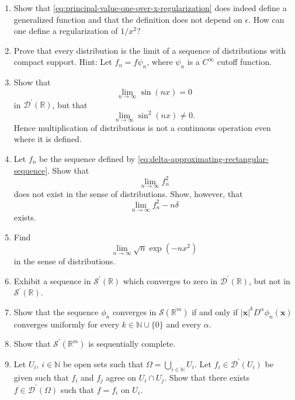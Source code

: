 \begin{enumerate}[label=\thesection.\arabic*.,ref=\thesection.\arabic*,start=1,series=book-problems]
\item\label{ex:principal-value-regularization} Show that \eqref{eq:principal-value-one-over-x-regularization} does indeed define a generalized function and that the definition does not depend on $\epsilon$. How can one define a regularization of $1/x^2$?

\item\label{ex:compactly-supported-distribution-density} Prove that every distribution is the limit of a sequence of distributions with compact support. Hint: Let $f_n=f\psi_n$, where $\psi_n$ is a $C^\infty$ cutoff function.

\item\label{ex:distribution-multiplication-not-continuous} Show that \[\lim_{n\to\infty}\sin(nx)=0\] in $\mathcal{D}^{\prime}(\mathbb{R})$, but that \[\lim_{n\to\infty}\sin^2(nx)\ne0.\] Hence multiplication of distributions is not a continuous operation even where it is defined.

\item\label{ex:delta-approximation-square-divergence} Let $f_n$ be the sequence defined by \eqref{eq:delta-approximating-rectangular-sequence}. Show that \[\lim_{n\to\infty}f_n^2\] does not exist in the sense of distributions. Show, however, that \[\lim_{n\to\infty}f_n^2-n\delta\] exists.

\item\label{ex:gaussian-distribution-limit} Find \[\lim_{n\to\infty}\sqrt n\exp(-nx^2)\] in the sense of distributions.

\item\label{ex:distribution-not-tempered-convergence} Exhibit a sequence in $\mathcal{S}^{\prime}(\mathbb{R})$ which converges to zero in $\mathcal{D}^{\prime}(\mathbb{R})$, but not in $\mathcal{S}^{\prime}(\mathbb{R})$.

\item\label{ex:rapid-tests-weighted-uniform-convergence} Show that the sequence $\phi_n$ converges in $\mathcal{S}(\mathbb{R}^m)$ if and only if $|\bm{x}|^kD^\alpha\phi_n(\bm{x})$ converges uniformly for every $k\in\mathbb{N}\cup\{0\}$ and every $\alpha$.

\item\label{ex:tempered-distributions-sequential-completeness} Show that $\mathcal{S}^{\prime}(\mathbb{R}^m)$ is sequentially complete.

\item\label{ex:distribution-gluing-open-cover} Let $U_i$, $i\in\mathbb{N}$ be open sets such that $\Omega=\bigcup_{i\in\mathbb{N}}U_i$. Let $f_i\in\mathcal{D}^{\prime}(U_i)$ be given such that $f_i$ and $f_j$ agree on $U_i\cap U_j$. Show that there exists $f\in\mathcal{D}^{\prime}(\Omega)$ such that $f=f_i$ on $U_i$.


\end{enumerate}

